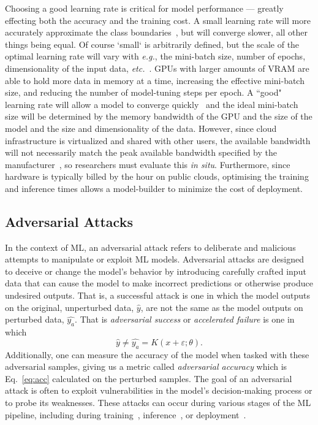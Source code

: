 \documentclass[conference]{IEEEtran}
\begin{document}
Choosing a good learning rate is critical for model performance --- greatly effecting both the accuracy and the training cost. A small learning rate will more accurately approximate the class boundaries~\cite{cao2019generalization}, but will converge slower, all other things being equal. Of course `small` is arbitrarily defined, but the scale of the optimal learning rate will vary with \textit{e.g.}, the mini-batch size, number of epochs, dimensionality of the input data, \textit{etc.}~\cite{granziol2022learning}. GPUs with larger amounts of VRAM are able to hold more data in memory at a time, increasing the effective mini-batch size, and reducing the number of model-tuning steps per epoch. A ``good" learning rate will allow a model to converge quickly~\cite{smith2019super,granziol2022learning} and the ideal mini-batch size will be determined by the memory bandwidth of the GPU and the size of the model and the size and dimensionality of the data. However, since cloud infrastructure is virtualized and shared with other users, the available bandwidth will not necessarily match the peak available bandwidth specified by the manufacturer~\cite{sajid2013cloud}, so researchers must evaluate this \textit{in situ}. Furthermore, since hardware is typically billed by the hour on public clouds, optimising the training and inference times allows a model-builder to minimize the cost of deployment. 


\subsection{Adversarial Attacks}
\label{attacks}
In the context of ML, an adversarial attack refers to deliberate and malicious attempts to manipulate or exploit ML models. Adversarial attacks are designed to deceive or change the model's behavior by introducing carefully crafted input data that can cause the model to make incorrect predictions or otherwise produce undesired outputs. That is, a successful attack is one in which the model outputs on the original, unperturbed data, $\hat{y}$, are not the same as the model outputs on perturbed data, $\hat{y_a}$. That is \textit{adversarial success} or \textit{accelerated failure} is one in which
\begin{equation}
    \hat{y} \neq \hat{y_a} = K(x + \varepsilon; \theta).
\label{eq:adv_success}
\end{equation}
Additionally, one can measure the accuracy of the model when tasked with these adversarial samples, giving us a metric called \textit{adversarial accuracy} which is Eq.~\ref{eq:acc} calculated on the perturbed samples. The goal of an adversarial attack is often to exploit vulnerabilities in the model's decision-making process or to probe its weaknesses. These attacks can occur during various stages of the ML pipeline, including during training~\cite{biggio_poisoning_2013, saha2020hidden}, inference~\cite{chakraborty_adversarial_2018, orekondy2019knockoff}, or deployment~\cite{chakraborty_adversarial_2018, choquette2021label, li2021membership, carlini_towards_2017, adversarialpatch, pixelattack, hopskipjump}.
\end{document}
